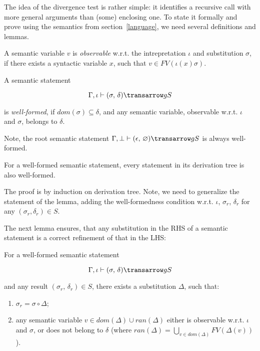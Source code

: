The idea of the divergence test is rather simple: it identifies a recursive call with more general arguments 
than (some) enclosing one. To state it formally and prove using the semantics from section~\ref{language}, we need several definitions and lemmas.

\begin{definition}
\normalfont
A semantic variable $v$ is \emph{observable} w.r.t. the intrepretation $\iota$ and substitution $\sigma$, if there exists 
a syntactic variable $x$, such that \mbox{$v \in FV(\iota(x) \sigma)$}.
\end{definition}

\begin{definition}
\normalfont
A semantic statement 

$$
\otrans{\Gamma,\iota}{(\sigma,\,\delta)}{g}{S}
$$ 

\noindent is \emph{well-formed}, if \mbox{$dom(\sigma) \subseteq \delta$}, and any semantic variable, observable w.r.t. $\iota$ and $\sigma$, belongs to $\delta$.  
\end{definition}

Note, the root semantic statement \mbox{$\otrans{\Gamma,\bot}{(\epsilon,\,\emptyset)}{g}{S}$} is always well-formed.

\begin{lemma}
\label{one}
\normalfont
 For a well-formed semantic statement, every statement in its derivation tree is also well-formed.
\end{lemma}

The proof is by induction on derivation tree. Note, we need to generalize the statement of the lemma, adding the well-formedness
condition w.r.t. $\iota$, $\sigma_r$, $\delta_r$ for any $(\sigma_r, \delta_r) \in S$.

The next lemma ensures, that any substitution in the RHS of a semantic statement is a correct refinement of that in the LHS:

\begin{lemma}
\label{two}
\normalfont
For a well-formed semantic statement 

$$
\otrans{\Gamma,\iota}{(\sigma,\,\delta)}{g}{S}
$$ 

\noindent and any result \mbox{$(\sigma_r,\,\delta_r) \in S$}, there exists a substitution $\Delta$, such that:
  \begin{enumerate}
    \item \mbox{$\sigma_r = \sigma\circ\Delta$};
    \item any semantic variable \mbox{$v\in dom(\Delta)\cup ran(\Delta)$} either is observable w.r.t. $\iota$ and $\sigma$,
 or does not belong to $\delta$ (where $ran(\Delta)=\bigcup_{v\in dom(\Delta)}FV(\Delta(v))$).
  \end{enumerate}   
\end{lemma}

